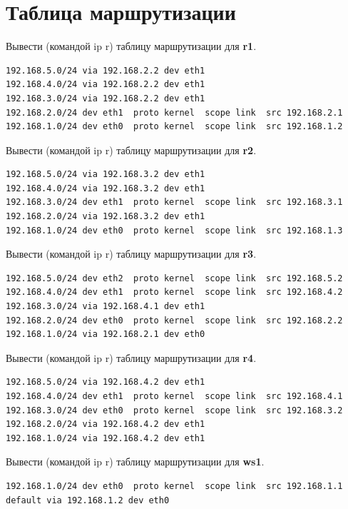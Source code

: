 \documentclass[a4paper,12pt]{article}
\begin{document}
\section{Таблица маршрутизации}

Вывести (командой ip r) таблицу маршрутизации для \textbf{r1}.

\begin{Verbatim}
192.168.5.0/24 via 192.168.2.2 dev eth1 
192.168.4.0/24 via 192.168.2.2 dev eth1 
192.168.3.0/24 via 192.168.2.2 dev eth1 
192.168.2.0/24 dev eth1  proto kernel  scope link  src 192.168.2.1 
192.168.1.0/24 dev eth0  proto kernel  scope link  src 192.168.1.2 
\end{Verbatim}

Вывести (командой ip r) таблицу маршрутизации для \textbf{r2}.

\begin{Verbatim}
192.168.5.0/24 via 192.168.3.2 dev eth1 
192.168.4.0/24 via 192.168.3.2 dev eth1 
192.168.3.0/24 dev eth1  proto kernel  scope link  src 192.168.3.1 
192.168.2.0/24 via 192.168.3.2 dev eth1 
192.168.1.0/24 dev eth0  proto kernel  scope link  src 192.168.1.3
\end{Verbatim}

Вывести (командой ip r) таблицу маршрутизации для \textbf{r3}.

\begin{Verbatim}
192.168.5.0/24 dev eth2  proto kernel  scope link  src 192.168.5.2 
192.168.4.0/24 dev eth1  proto kernel  scope link  src 192.168.4.2 
192.168.3.0/24 via 192.168.4.1 dev eth1 
192.168.2.0/24 dev eth0  proto kernel  scope link  src 192.168.2.2 
192.168.1.0/24 via 192.168.2.1 dev eth0 
\end{Verbatim}

Вывести (командой ip r) таблицу маршрутизации для \textbf{r4}.

\begin{Verbatim}
192.168.5.0/24 via 192.168.4.2 dev eth1 
192.168.4.0/24 dev eth1  proto kernel  scope link  src 192.168.4.1 
192.168.3.0/24 dev eth0  proto kernel  scope link  src 192.168.3.2 
192.168.2.0/24 via 192.168.4.2 dev eth1 
192.168.1.0/24 via 192.168.4.2 dev eth1 
\end{Verbatim}

Вывести (командой ip r) таблицу маршрутизации для \textbf{ws1}.

\begin{Verbatim}
192.168.1.0/24 dev eth0  proto kernel  scope link  src 192.168.1.1 
default via 192.168.1.2 dev eth0 
\end{Verbatim}
\end{document}

